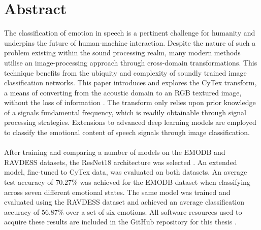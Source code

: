 \chapter*{Abstract}
The classification of emotion in speech is a pertinent challenge for humanity and underpins the future of human-machine interaction. Despite the nature of such a problem existing within the sound processing realm, many modern methods utilise an image-processing approach through cross-domain transformations. This technique benefits from the ubiquity and complexity of soundly trained image classification networks. This paper introduces and explores the CyTex transform, a means of converting from the acoustic domain to an RGB textured image, without the loss of information \cite{CyTexRef}. The transform only relies upon prior knowledge of a signals fundamental frequency, which is readily obtainable through signal processing strategies. Extensions to advanced deep learning models are employed to classify the emotional content of speech signals through image classification. \\ \\
After training and comparing a number of models on the EMODB and RAVDESS datasets, the ResNet18 architecture was selected \cite{he2015deep}. An extended model, fine-tuned to CyTex data, was evaluated on both datasets. An average test accuracy of $70.27\%$ was achieved for the EMODB dataset when classifying across seven different emotional states. The same model was trained and evaluated using the RAVDESS dataset and achieved an average  classification accuracy of $56.87\%$ over a set of six emotions. All software resources used to acquire these results are included in the GitHub repository for this thesis \cite{Blake_ELEC4840B-Repo}.\\ \\
